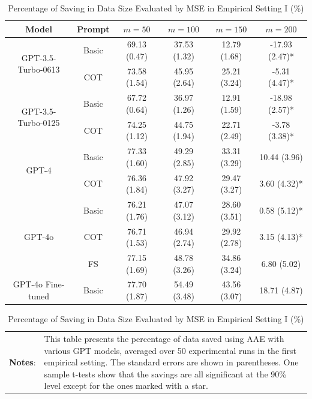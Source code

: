 \begin{table}[!h]
\renewcommand{\arraystretch}{1.3}
\centering
{\footnotesize
\caption{Percentage of Saving in Data Size Evaluated by MSE in Empirical Setting I (\%)}
\label{tab:saving-mse}
\begin{tabular}{cccccc}\hline\hline
Model    & Prompt & $m=50$          & $m=100$         & $m=150$         &$m=200$         \\\hline
\multirow{2}{*}{GPT-3.5-Turbo-0613} & Basic & 69.13 (0.47) & 37.53 (1.32) & 12.79 (1.68) & -17.93 (2.47)* \\
 & COT & 73.58 (1.54) & 45.95 (2.64) & 25.21 (3.24) & -5.31 (4.47)* \\
\multirow{2}{*}{GPT-3.5-Turbo-0125} & Basic & 67.72 (0.64) & 36.97 (1.26) & 12.91 (1.59) & -18.98 (2.57)* \\
 & COT & 74.25 (1.12) & 44.75 (1.94) & 22.71 (2.49) & -3.78 (3.38)* \\
\multirow{2}{*}{GPT-4} & Basic & 77.33 (1.60) & 49.29 (2.85) & 33.31 (3.29) & 10.44 (3.96) \\
 & COT & 76.36 (1.84) & 47.92 (3.27) & 29.47 (3.27) & 3.60 (4.32)* \\
\multirow{3}{*}{GPT-4o} & Basic & 76.21 (1.76) & 47.07 (3.12) & 28.60 (3.51) & 0.58 (5.12)* \\
 & COT & 76.71 (1.53) & 46.94 (2.74) & 29.92 (2.78) & 3.15 (4.13)* \\
 & FS & 77.15 (1.69) & 48.78 (3.26) & 34.86 (3.24) & 6.80 (5.02) \\
GPT-4o Fine-tuned & Basic & 77.70 (1.87) & 54.49 (3.48) & 43.56 (3.07) & 18.71 (4.87)     \\\hline\hline
\end{tabular}}
\begin{minipage}{15.5cm}
\vspace{3pt}
    \footnotesize
    \begin{tabular}{p{1cm} p{14cm}}
         \textbf{Notes}: & \setlength{\baselineskip}{1.2\baselineskip} 
    This table presents the percentage of data saved using AAE with various GPT models, averaged over 50 experimental runs in the first empirical setting. The standard errors are shown in parentheses. One sample t-tests show that the savings are all significant at the 90\% level except for the ones marked with a star.
    \end{tabular}
  \end{minipage}
\end{table}


